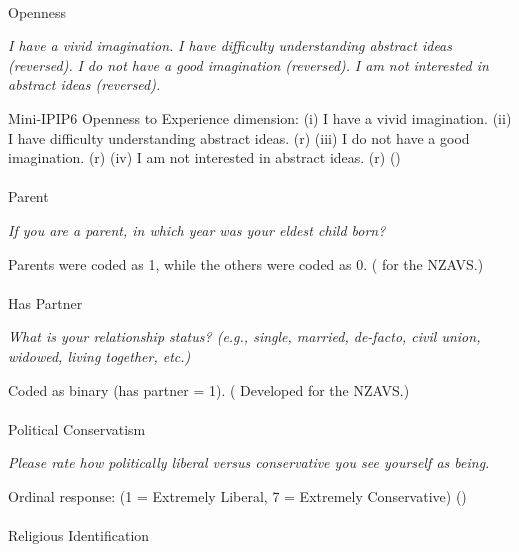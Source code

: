 \documentclass[
  single column]{article}
\makeatletter
\let\oldparagraph\paragraph
\renewcommand{\paragraph}{
    \@ifstar
      \xxxParagraphStar
      \xxxParagraphNoStar
  }
\newcommand{\xxxParagraphStar}[1]{\oldparagraph*{#1}\mbox{}}
\newcommand{\xxxParagraphNoStar}[1]{\oldparagraph{#1}\mbox{}}
\makeatother
\begin{document}
\paragraph{Openness}\label{openness}

\emph{I have a vivid imagination.} \emph{I have difficulty understanding
abstract ideas (reversed).} \emph{I do not have a good imagination
(reversed).} \emph{I am not interested in abstract ideas (reversed).}

Mini-IPIP6 Openness to Experience dimension: (i) I have a vivid
imagination. (ii) I have difficulty understanding abstract ideas. (r)
(iii) I do not have a good imagination. (r) (iv) I am not interested in
abstract ideas. (r) ()

\paragraph{Parent}\label{parent}

\emph{If you are a parent, in which year was your eldest child born?}

Parents were coded as 1, while the others were coded as 0.
( for the NZAVS.)

\paragraph{Has Partner}\label{has-partner}

\emph{What is your relationship status? (e.g., single, married,
de-facto, civil union, widowed, living together, etc.)}

Coded as binary (has partner = 1).
( Developed for the
NZAVS.)

\paragraph{Political Conservatism}\label{political-conservatism}

\emph{Please rate how politically liberal versus conservative you see
yourself as being.}

Ordinal response: (1 = Extremely Liberal, 7 = Extremely Conservative)
()

\paragraph{Religious Identification}\label{religious-identification}
\end{document}
